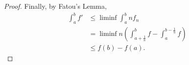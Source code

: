 \begin{proof}
	Finally, by Fatou's Lemma,
	\begin{align*}
		\int _a^b f' 
		&\leq \liminf \int _a^b n f_n \\
		&= \liminf n \left( \int_{a + \frac{1}{n}}^b f - \int _a^{b - \frac{1}{n}}f \right)  \\
		&\le  f(b) - f(a)
	.\end{align*}
\end{proof}

